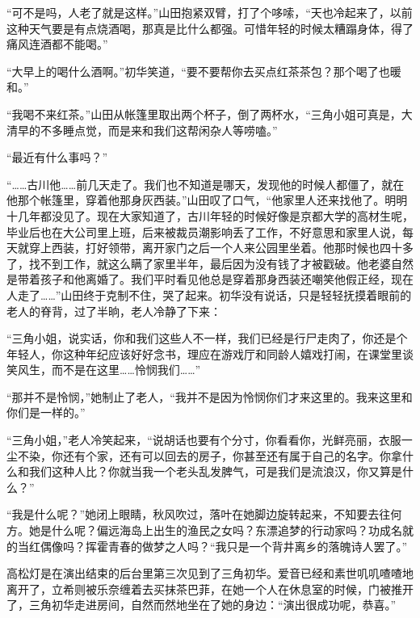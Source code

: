 \documentclass{article}
\begin{document}
“可不是吗，人老了就是这样。”山田抱紧双臂，打了个哆嗦，“天也冷起来了，以前这种天气要是有点烧酒喝，那真是比什么都强。可惜年轻的时候太糟蹋身体，得了痛风连酒都不能喝。”



“大早上的喝什么酒啊。”初华笑道，“要不要帮你去买点红茶茶包？那个喝了也暖和。”



“我喝不来红茶。”山田从帐篷里取出两个杯子，倒了两杯水，“三角小姐可真是，大清早的不多睡点觉，而是来和我们这帮闲杂人等唠嗑。”



“最近有什么事吗？”



“……古川他……前几天走了。我们也不知道是哪天，发现他的时候人都僵了，就在他那个帐篷里，穿着他那身灰西装。”山田叹了口气，“他家里人还来找他了。明明十几年都没见了。现在大家知道了，古川年轻的时候好像是京都大学的高材生呢，毕业后也在大公司里上班，后来被裁员潮影响丢了工作，不好意思和家里人说，每天就穿上西装，打好领带，离开家门之后一个人来公园里坐着。他那时候也四十多了，找不到工作，就这么瞒了家里半年，最后因为没有钱了才被戳破。他老婆自然是带着孩子和他离婚了。我们平时看见他总是穿着那身西装还嘲笑他假正经，现在人走了……”山田终于克制不住，哭了起来。初华没有说话，只是轻轻抚摸着眼前的老人的脊背，过了半晌，老人冷静了下来：



“三角小姐，说实话，你和我们这些人不一样，我们已经是行尸走肉了，你还是个年轻人，你这种年纪应该好好念书，理应在游戏厅和同龄人嬉戏打闹，在课堂里谈笑风生，而不是在这里……怜悯我们……”



“那并不是怜悯，”她制止了老人，“我并不是因为怜悯你们才来这里的。我来这里和你们是一样的。”



“三角小姐，”老人冷笑起来，“说胡话也要有个分寸，你看看你，光鲜亮丽，衣服一尘不染，你还有个家，还有可以回去的房子，你甚至还有属于自己的名字。你拿什么和我们这种人比？你就当我一个老头乱发脾气，可是我们是流浪汉，你又算是什么？”



“我是什么呢？”她闭上眼睛，秋风吹过，落叶在她脚边旋转起来，不知要去往何方。她是什么呢？偏远海岛上出生的渔民之女吗？东漂追梦的行动家吗？功成名就的当红偶像吗？挥霍青春的做梦之人吗？“我只是一个背井离乡的落魄诗人罢了。”



\newpage



高松灯是在演出结束的后台里第三次见到了三角初华。爱音已经和素世叽叽喳喳地离开了，立希则被乐奈缠着去买抹茶巴菲，在她一个人在休息室的时候，门被推开了，三角初华走进房间，自然而然地坐在了她的身边：“演出很成功呢，恭喜。”
\end{document}
